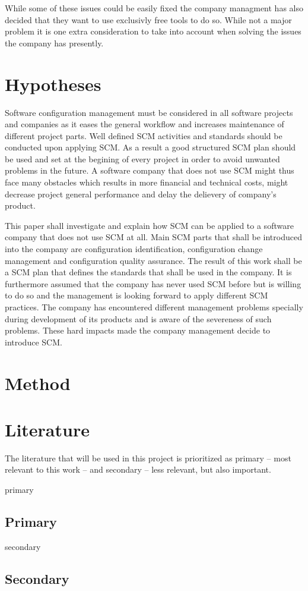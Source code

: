 \documentclass[a4paper]{article}
\begin{document}
While some of these issues could be easily fixed the company managment has also decided that they want to use exclusivly free tools to do so. While not a major problem it is one extra consideration to take into account when solving the issues the company has presently.

\section{Hypotheses}
Software configuration management must be considered in all software projects and companies as it eases the general workflow and increases maintenance of different project parts. Well defined SCM activities and standards should be conducted upon applying SCM. As a result a good structured SCM plan should be used and set at the begining of every project in order to avoid unwanted problems in the future. A software company that does not use SCM might thus face many obstacles which results in more financial and technical costs, might decrease project general performance and delay the delievery of company's product. 

This paper shall investigate and explain how SCM can be applied to a software company that does not use SCM at all. Main SCM parts that shall be introduced into the company are configuration identification, configuration change management and configuration quality assurance. The result of this work shall be a SCM plan that defines the standards that shall be used in the company. It is furthermore assumed that the company has never used SCM before but is willing to do so and the management is looking forward to apply different SCM practices. The company has encountered different management problems specially during development of its products and is aware of the severeness of such problems. These hard impacts made the company management decide to introduce SCM.

\section{Method}

\newpage
\appendix
\section{Literature}

The literature that will be used in this project is prioritized as primary -- most relevant to this work -- and secondary -- less relevant, but also important. 
\begin{btSect}[alpha]{primary}
\subsection{Primary}
\btPrintAll
\end{btSect}

\begin{btSect}[alpha]{secondary}
\subsection{Secondary}
\btPrintAll
\end{btSect}
\end{document}
